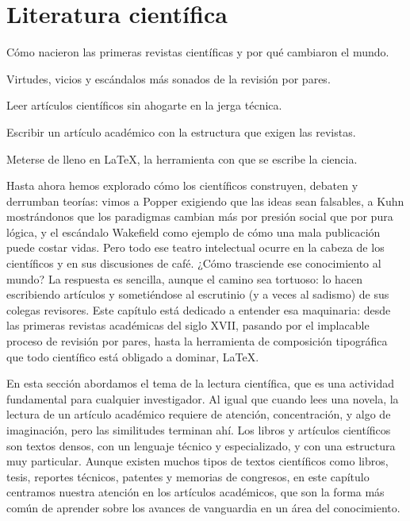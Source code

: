 \chapter{Literatura científica}
\label{cha:literaturacientifica}

\begin{enestecapitulo}
	\item[\emoji{scroll}] Cómo nacieron las primeras revistas científicas y por qué cambiaron el mundo.
	\item[\emoji{mag}] Virtudes, vicios y escándalos más sonados de la revisión por pares.
	\item[\emoji{open-book}] Leer artículos científicos sin ahogarte en la jerga técnica.
	\item[\emoji{pen}] Escribir un artículo académico con la estructura que exigen las revistas.
	\item[\emoji{desktop-computer}] Meterse de lleno en \LaTeX, la herramienta con que se escribe la ciencia.
\end{enestecapitulo}

Hasta ahora hemos explorado cómo los científicos construyen, debaten y derrumban teorías: vimos a Popper exigiendo que las ideas sean falsables, a Kuhn mostrándonos que los paradigmas cambian más por presión social que por pura lógica, y el escándalo Wakefield como ejemplo de cómo una mala publicación puede costar vidas.
Pero todo ese teatro intelectual ocurre en la cabeza de los científicos y en sus discusiones de café.
¿Cómo trasciende ese conocimiento al mundo?
La respuesta es sencilla, aunque el camino sea tortuoso: lo hacen escribiendo artículos y sometiéndose al escrutinio (y a veces al sadismo) de sus colegas revisores.
Este capítulo está dedicado a entender esa maquinaria: desde las primeras revistas académicas del siglo XVII, pasando por el implacable proceso de revisión por pares, hasta la herramienta de composición tipográfica que todo científico está obligado a dominar, \LaTeX.

En esta sección abordamos el tema de la lectura científica, que es una actividad fundamental para cualquier investigador.
Al igual que cuando lees una novela, la lectura de un artículo académico requiere de atención, concentración, y algo de imaginación, pero las similitudes terminan ahí.
Los libros y artículos científicos son textos densos, con un lenguaje técnico y especializado, y con una estructura muy particular.
Aunque existen muchos tipos de textos científicos como libros, tesis, reportes técnicos, patentes y memorias de congresos, en este capítulo centramos nuestra atención en los artículos académicos, que son la forma más común de aprender sobre los avances de vanguardia en un área del conocimiento.

